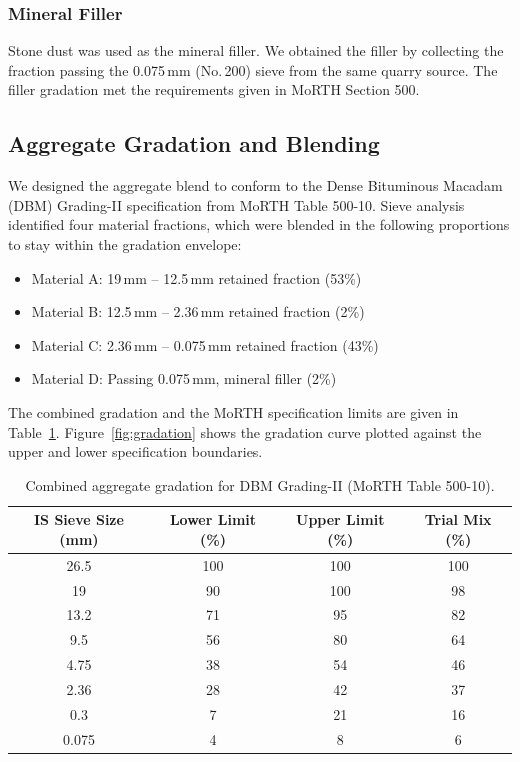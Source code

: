 \documentclass[12pt,a4paper]{article}
\begin{document}
\subsubsection{Mineral Filler}

Stone dust was used as the mineral filler. We obtained the filler by collecting the fraction passing the 0.075\,mm (No.\,200) sieve from the same quarry source. The filler gradation met the requirements given in MoRTH Section 500.

\subsection{Aggregate Gradation and Blending}
\label{subsec:agg_gradation}

We designed the aggregate blend to conform to the Dense Bituminous Macadam (DBM) Grading-II specification from MoRTH Table 500-10. Sieve analysis identified four material fractions, which were blended in the following proportions to stay within the gradation envelope:

\begin{itemize}
    \item Material A: 19\,mm -- 12.5\,mm retained fraction (53\%)
    \item Material B: 12.5\,mm -- 2.36\,mm retained fraction (2\%)
    \item Material C: 2.36\,mm -- 0.075\,mm retained fraction (43\%)
    \item Material D: Passing 0.075\,mm, mineral filler (2\%)
\end{itemize}

The combined gradation and the MoRTH specification limits are given in Table~\ref{tab:gradation}. Figure~\ref{fig:gradation} shows the gradation curve plotted against the upper and lower specification boundaries.

\begin{table}[htbp]
    \centering
    \caption{Combined aggregate gradation for DBM Grading-II (MoRTH Table 500-10).}
    \label{tab:gradation}
    \begin{tabular}{@{}cccc@{}}
        \toprule
        \textbf{IS Sieve Size (mm)} & \textbf{Lower Limit (\%)} & \textbf{Upper Limit (\%)} & \textbf{Trial Mix (\%)} \\
        \midrule
        26.5  & 100 & 100 & 100 \\
        19    & 90  & 100 & 98  \\
        13.2  & 71  & 95  & 82  \\
        9.5   & 56  & 80  & 64  \\
        4.75  & 38  & 54  & 46  \\
        2.36  & 28  & 42  & 37  \\
        0.3   & 7   & 21  & 16  \\
        0.075 & 4   & 8   & 6   \\
        \bottomrule
    \end{tabular}
\end{table}
\end{document}
